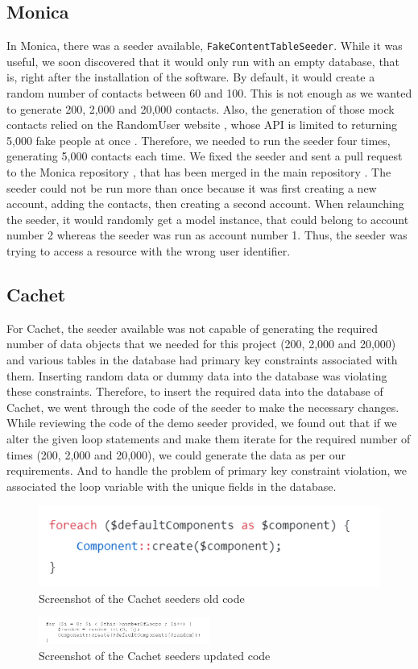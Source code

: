 \documentclass[sigconf]{acmart}
\begin{document}
\subsection{Monica}
In Monica, there was a seeder available, \texttt{FakeContentTableSeeder}. While it was useful, we soon discovered that it would only run with an empty database, that is, right after the installation of the software. By default, it would create a random number of contacts between 60 and 100. This is not enough as we wanted to generate 200, 2,000 and 20,000 contacts. Also, the generation of those mock contacts relied on the RandomUser website \cite{randomuser}, whose API is limited to returning 5,000 fake people at once \cite{randomuserdoc}. Therefore, we needed to run the seeder four times, generating 5,000 contacts each time. We fixed the seeder and sent a pull request to the Monica repository \cite{prseedmonica}, that has been merged in the main repository . The seeder could not be run more than once because it was first creating a new account, adding the contacts, then creating a second account. When relaunching the seeder, it would randomly get a model instance, that could belong to account number 2 whereas the seeder was run as account number 1. Thus, the seeder was trying to access a resource with the wrong user identifier.
\subsection{Cachet}
For Cachet, the seeder available \cite{cachetseeder} was not capable of generating the required number of  data objects that we needed for this project (200, 2,000 and 20,000)  and various tables in the database had primary key constraints associated with them. Inserting random data or dummy data into the database was violating these constraints. Therefore, to insert the required data into the database of Cachet, we went through the code of the seeder to make the necessary changes. While reviewing the code of the demo seeder provided, we found out that if we alter the given loop statements and make them iterate for the required number of times (200, 2,000 and 20,000), we could generate the data as per our requirements. And to handle the problem of primary key constraint  violation, we associated the loop variable with the unique fields in the database. 
\begin{figure}
\includegraphics[]{Previous_Code}
\caption{Screenshot of the Cachet seeders old code}
\label{Previous_Code}
\end{figure}
\begin{figure}
\includegraphics[width=0.5\textwidth]{Updated_Code}
\caption{Screenshot of the Cachet seeders updated code}
\label{Updated_Code}
\end{figure}
\end{document}

